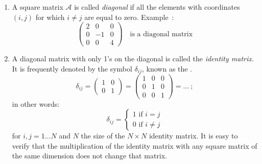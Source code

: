 \begin{enumerate}
Note that we can always multiply two square matrices with identical dimensions, but the order of the multiplication \textit{is important}.
Take a look at the following example.  We define two square matrices $\mathcal{S}$ and $\mathcal{T}$~:
\[
\mathcal{S}=\begin{pmatrix}3&6\\-4&-8\end{pmatrix}\qquad\mathcal{T}=\begin{pmatrix}-10&-4\\ 5&2\end{pmatrix}
\]
It is easy to verify that the products $\mathcal{ST}$ and $\mathcal{TS}$ are \underline{not} equal~:
\[
\mathcal{ST}=\begin{pmatrix}0&0\\ 0&0\end{pmatrix}\qquad\mathcal{TS}=\begin{pmatrix}-14& -28\\ 7&14\end{pmatrix}
\]
In contrast with regular numbers, where the order of multiplication is not important, matrix multiplication \textit{is not commutative}.

\item A square matrix $\mathcal{A}$ is called \textit{diagonal} if all the elements with coordinates $(i,j)$ for which $i\neq j$ are equal to zero. 
Example~:
\[
\begin{pmatrix}2&0&0\\ 0&-1&0\\ 0&0&4\end{pmatrix}\quad\mbox{is a diagonal matrix}
\]

\item A diagonal matrix with only 1's on the diagonal is called the \textit{identity matrix}.  It is frequently denoted by the symbol $\delta_{ij}$, known as the .
\[
\delta_{ij}=\begin{pmatrix}1&0\\ 0&1\end{pmatrix}=\begin{pmatrix}1&0&0\\ 0&1&0\\ 0&0&1\end{pmatrix}=\ldots\ ;
\]
in other words:
\[
	\delta_{ij} = \left\{ \begin{matrix}1\text{ if }i=j\\ 0\text{ if } i\ne j\end{matrix}\right.
\]
for $i,j=1\ldots N$ and $N$ the size of the $N\times N$ identity matrix.  It is easy to verify that the multiplication of the identity matrix with any square matrix of the same dimension does not change that matrix.


\end{enumerate}
